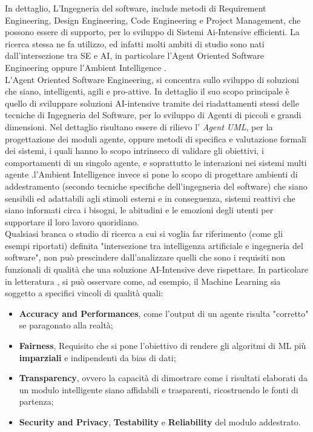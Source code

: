 In dettaglio, L'Ingegneria del software, include metodi di Requirement Engineering, Design Engineering, Code Engineering e Project Management, che possono essere di supporto, per lo sviluppo di Sistemi Ai-Intensive efficienti. La ricerca stessa ne fa utilizzo, ed infatti molti ambiti di studio sono nati dall'intersezione tra SE e AI, in particolare l'Agent Oriented Software Engineering oppure l'Ambient Intelligence \cite{jain2011interaction}.\\

L'Agent Oriented Software Engineering, si concentra sullo sviluppo di soluzioni che siano, intelligenti, agili e pro-attive. In dettaglio il suo scopo principale è quello di sviluppare soluzioni AI-intensive tramite dei riadattamenti stessi delle tecniche di Ingegneria del Software, per lo sviluppo di Agenti di piccoli e grandi dimensioni. Nel dettaglio risultano essere di rilievo l' \textit{Agent UML}, per la progettazione dei moduli agente, oppure metodi di specifica e valutazione formali dei sistemi, i quali hanno lo scopo intrinseco di validare gli obiettivi, i comportamenti di un singolo agente, e soprattutto le interazioni nei sistemi multi agente \cite{rech2004artificial}.l'Ambient Intelligence invece si pone lo scopo di progettare ambienti di addestramento (secondo tecniche specifiche dell'ingegneria del software) che siano sensibili ed adattabili agli stimoli esterni e in conseguenza, sistemi reattivi che siano informati circa i bisogni, le abitudini e le emozioni degli utenti per supportare il loro lavoro quoridiano\cite{rech2004artificial}.\\

Qualsiasi branca o studio di ricerca a cui si voglia far riferimento (come gli esempi riportati) definita "intersezione tra intelligenza artificiale e ingegneria del software", non può prescindere dall'analizzare quelli che sono i requisiti non funzionali di qualità che una soluzione AI-Intensive deve rispettare. In particolare in letteratura \cite{NFRForML}, si può osservare come, ad esempio, il Machine Learning sia soggetto a specifici vincoli di qualità quali: 

\begin{itemize}
    \item \textbf{Accuracy and Performances}, come l'output di un agente risulta "corretto" se paragonato alla realtà;
    \item \textbf{Fairness}, Requisito che si pone l'obiettivo di rendere gli algoritmi di ML più \textbf{imparziali} e indipendenti da bias di dati;
    \item \textbf{Transparency}, ovvero la capacità di dimostrare come i risultati elaborati da un modulo intelligente siano affidabili e trasparenti, ricostruendo le fonti di partenza;
    \item \textbf{Security and Privacy}, \textbf{Testability} e \textbf{Reliability} del modulo addestrato.
\end{itemize}

